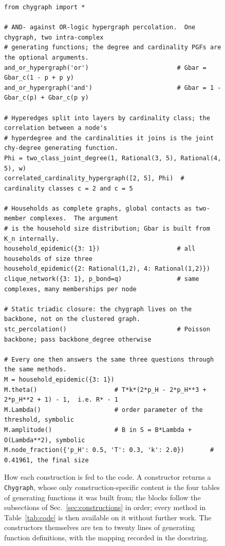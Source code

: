 \documentclass[aps,pre,twocolumn,superscriptaddress,floatfix,longbibliography]{revtex4-2}
\newcommand{\code}[1]{\texttt{#1}}
\begin{document}
\begin{figure}[t]
\small
\begin{verbatim}
from chygraph import *

# AND- against OR-logic hypergraph percolation.  One chygraph, two intra-complex
# generating functions; the degree and cardinality PGFs are the optional arguments.
and_or_hypergraph('or')                        # Gbar = Gbar_c(1 - p + p y)
and_or_hypergraph('and')                       # Gbar = 1 - Gbar_c(p) + Gbar_c(p y)

# Hyperedges split into layers by cardinality class; the correlation between a node's
# hyperdegree and the cardinalities it joins is the joint chy-degree generating function.
Phi = two_class_joint_degree(1, Rational(3, 5), Rational(4, 5), w)
correlated_cardinality_hypergraph([2, 5], Phi)  # cardinality classes c = 2 and c = 5

# Households as complete graphs, global contacts as two-member complexes.  The argument
# is the household size distribution; Gbar is built from K_n internally.
household_epidemic({3: 1})                     # all households of size three
household_epidemic({2: Rational(1,2), 4: Rational(1,2)})
clique_network({3: 1}, p_bond=q)               # same complexes, many memberships per node

# Static triadic closure: the chygraph lives on the backbone, not on the clustered graph.
stc_percolation()                              # Poisson backbone; pass backbone_degree otherwise

# Every one then answers the same three questions through the same methods.
M = household_epidemic({3: 1})
M.theta()                     # T*k*(2*p_H - 2*p_H**3 + 2*p_H**2 + 1) - 1,  i.e. R* - 1
M.Lambda()                    # order parameter of the threshold, symbolic
M.amplitude()                 # B in S = B*Lambda + O(Lambda**2), symbolic
M.node_fraction({'p_H': 0.5, 'T': 0.3, 'k': 2.0})       # 0.41961, the final size
\end{verbatim}
\caption{\label{fig:code}How each construction is fed to the code. A constructor
returns a \code{Chygraph}, whose only construction-specific content is the four
tables of generating functions it was built from; the blocks follow the
subsections of Sec.~\ref{sec:constructions} in order; every method in
Table~\ref{tab:code} is then available on it without further work. The
constructors themselves are ten to twenty lines of generating function
definitions, with the mapping recorded in the docstring.}
\end{figure}
\end{document}
